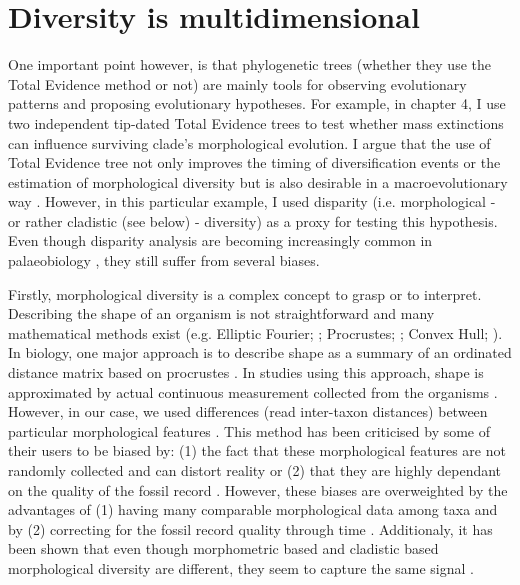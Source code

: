 \section{Diversity is multidimensional}
One important point however, is that phylogenetic trees (whether they use the Total Evidence method or not) are mainly tools for observing evolutionary patterns and proposing evolutionary hypotheses.
For example, in chapter 4, I use two independent tip-dated Total Evidence trees to test whether mass extinctions can influence surviving clade's morphological evolution.
I argue that the use of Total Evidence tree not only improves the timing of diversification events \citep[][; which is a crucial aspect when studying effect of mass extinctions which are finites points in time]{ronquista2012} or the estimation of morphological diversity \citep[increasing accuracy in reconstructing node's ancestral characters;][]{Finarelli2006} but is also desirable in a macroevolutionary way \citep{fritzdiversity2013,benton2015}.
However, in this particular example, I used disparity (i.e. morphological - or rather cladistic (see below) - diversity) as a proxy for testing this hypothesis.
Even though disparity analysis are becoming increasingly common in palaeobiology \citep[e.g.]{Butler2012,brusattedinosaur2012,toljagictriassic-jurassic2013,brusattegradual2014,bensonfaunal2014,Claddis,Close2015}, they still suffer from several biases.

Firstly, morphological diversity is a complex concept to grasp or to interpret.
Describing the shape of an organism is not straightforward and many mathematical methods exist (e.g. Elliptic Fourier; \citealt{Fourier1982}; Procrustes; \citealt{JamesRohlf1993129}; Convex Hull; \citealt{ANDREW1979216}).
In biology, one major approach is to describe shape as a summary of an ordinated distance matrix based on procrustes \citep[i.e. a geometric morphometric approach][]{zelditch2012geometric}.
In studies using this approach, shape is approximated by actual continuous measurement collected from the organisms \citep[e.g.][]{friedmanexplosive2010,hopkinsdecoupling2013,finlay2015morphological}.
However, in our case, we used differences (read inter-taxon distances) between particular morphological features \citep[e.g.][]{foote1997evolution,Wills2001,Wesley-Hunt2005}.
This method has been criticised by some of their users to be biased by: (1) the fact that these morphological features are not randomly collected and can distort reality \citep{Brusatte12092008}%
 or (2) that they are highly dependant on the quality of the fossil record \citep{Butler2012}.
However, these biases are overweighted by the advantages of (1) having many comparable morphological data among taxa \citep{Brusatte12092008} and by (2) correcting for the fossil record quality through time \citep{Butler2012}.
Additionaly, it has been shown that even though morphometric based and cladistic based morphological diversity are different, they seem to capture the same signal \citep{foth2012different,hetherington2015cladistic}.

